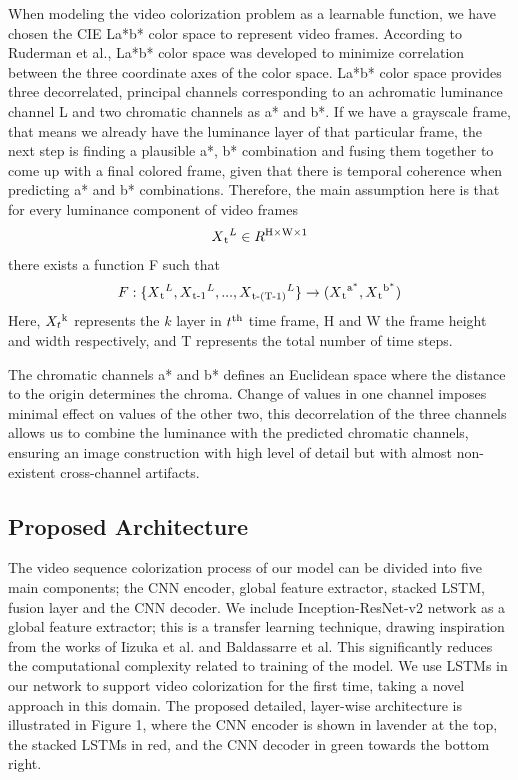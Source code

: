 \documentclass[10pt,twocolumn,letterpaper]{article}
\begin{document}
When modeling the video colorization problem as a learnable function, we have chosen the CIE La*b* color space to represent video frames. According to Ruderman et al.\cite{Ruderman98statisticsof}, La*b* color space was developed to minimize correlation between the three coordinate axes of the color space. La*b* color space provides three decorrelated, principal channels corresponding to an achromatic luminance channel L and two chromatic channels as a* and b*. 
If we have a grayscale frame, that means we already have the luminance layer of that particular frame, the next step is finding a plausible a*, b* combination and fusing them together to come up with a final colored frame, given that there is temporal coherence when predicting a* and b* combinations. Therefore, the main assumption here is that for every luminance component of video frames \begin{equation} X\textsubscript{t}^L\in R\textsuperscript{H$\times$W$\times$1} \end{equation} there exists a function F such that \begin{equation}F: \{X\textsubscript{t}^L, X\textsubscript{t-1}^L,..., X\textsubscript{t-(T-1)}^L\} \rightarrow (X\textsubscript{t}\textsuperscript{a$^\ast$}, 
X\textsubscript{t}\textsuperscript{b$^\ast$})\end{equation}  
Here, $X_{t}\textsuperscript{k}$ represents the $k$ layer in $t\textsuperscript{th}$ time frame, H and W the frame height and width respectively, and T represents the total number of time steps.

The chromatic channels a* and b* defines an Euclidean space where the distance to the origin determines the chroma. Change of values in one channel imposes minimal effect on values of the other two, this decorrelation of the three channels allows us to combine the luminance with the predicted chromatic channels, ensuring an image construction with high level of detail but with almost non-existent cross-channel artifacts.

\subsection{Proposed Architecture}

The video sequence colorization process of our model can be divided into five main components; the CNN encoder, global feature extractor, stacked LSTM, fusion layer and the CNN decoder. We include Inception-ResNet-v2 network as a global feature extractor; this is a transfer learning technique, drawing inspiration from the works of Iizuka et al. and Baldassarre et al. This significantly reduces the computational complexity related to training of the model. We use LSTMs in our network to support video colorization for the first time, taking a novel approach in this domain. The proposed detailed, layer-wise architecture is illustrated in Figure 1, where the CNN encoder is shown in lavender at the top, the stacked LSTMs in red, and the CNN decoder in green towards the bottom right.
\end{document}
